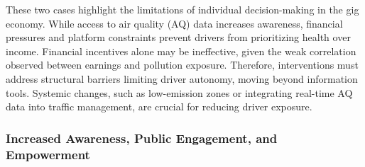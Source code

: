 These two cases highlight the limitations of individual decision-making in the gig economy. 
While access to air quality (AQ) data increases awareness, financial pressures and platform constraints prevent drivers from prioritizing health over income.
Financial incentives alone may be ineffective, given the weak correlation observed between earnings and pollution exposure.
Therefore, interventions must address structural barriers limiting driver autonomy, moving beyond information tools.
Systemic changes, such as low-emission zones or integrating real-time AQ data into traffic management, are crucial for reducing driver exposure.







\subsubsection{Increased Awareness, Public Engagement, and Empowerment}


